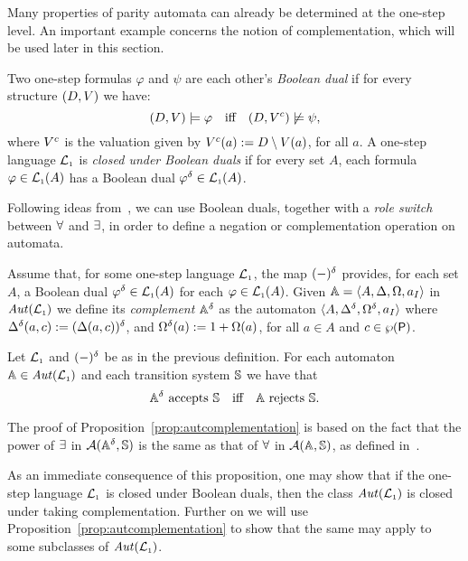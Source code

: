 Many properties of parity automata can already be determined at the one-step level.
An important example concerns the notion of complementation, which will be used later in this section.


\begin{definition}
\label{d:bdual1}
Two one-step formulas $\varphi$ and $\psi$ are each other's \emph{Boolean dual}
if for every structure $(D,V)$ we have:
\[
(D,\val) \models \varphi \quad\text{iff}\quad (D,\val^{c}) \not\models \psi,
\]
where $V^{c}$ is the valuation given by $V^{c}(a) \mathrel{:=} D
\setminus V(a)$, for all $a$.
%
A one-step language $\mathcal{L}_{\scriptscriptstyle 1}$ is \emph{closed under Boolean duals} if for every
set $A$, each formula $\varphi \in \mathcal{L}_{\scriptscriptstyle 1}(A)$ has a Boolean dual $\varphi^{\delta}
\in \mathcal{L}_{\scriptscriptstyle 1}(A)$.
\end{definition}

Following ideas from~\cite{Muller1987,DBLP:conf/calco/KissigV09}, we can use Boolean duals, together with a
\emph{role switch} between $\forall$ and $\exists$, in order to define a
negation or complementation operation on automata.

\begin{definition}
\label{d:caut}
Assume that, for some one-step language $\mathcal{L}_{\scriptscriptstyle 1}$, the map $(-)^{\delta}$
provides, for each set $A$, a Boolean dual $\varphi^{\delta} \in \mathcal{L}_{\scriptscriptstyle 1}(A)$ for each
$\varphi \in \mathcal{L}_{\scriptscriptstyle 1}(A)$.
Given $\mathbb{A} = \langle{A,\Delta,\Omega,a_I}\rangle$ in $\mathit{Aut}(\mathcal{L}_{\scriptscriptstyle 1})$ we define its
\emph{complement} $\mathbb{A}^{\delta}$ as the automaton
$\langle{A,\Delta^{\delta},\Omega^{\delta},a_I}\rangle$
where $\Delta^{\delta}(a,c) := (\Delta(a,c))^{\delta}$, and $\Omega^{\delta}(a)
:= 1 + \Omega(a)$, for all $a \in A$ and $c \in \wp(\mathsf{P})$.
\end{definition}

\begin{proposition}
\label{prop:autcomplementation}
Let $\mathcal{L}_{\scriptscriptstyle 1}$ and $(-)^{\delta}$ be as in the previous definition.
For each automaton $\mathbb{A} \in \mathit{Aut}(\mathcal{L}_{\scriptscriptstyle 1})$ and each transition system
$\mathbb{S}$ we have that
\[
\dual{\aut} \text{ accepts } \model
\quad\text{iff}\quad
\aut \text{ rejects } \model.
\]
\end{proposition}

The proof of Proposition~\ref{prop:autcomplementation} is based on the fact
that the power of $\exists$ in $\mathcal{A}(\mathbb{A}^{\delta},\mathbb{S})$ is the same
as that of $\forall$ in $\mathcal{A}(\mathbb{A},\mathbb{S})$, as defined in~\cite{DBLP:conf/calco/KissigV09}.

As an immediate consequence of this proposition, one may show that if the
one-step language $\mathcal{L}_{\scriptscriptstyle 1}$ is closed under Boolean duals, then the class
$\mathit{Aut}(\mathcal{L}_{\scriptscriptstyle 1})$ is closed under taking complementation.
Further on we will use Proposition~\ref{prop:autcomplementation} to show that
the same may apply to some subclasses of $\mathit{Aut}(\mathcal{L}_{\scriptscriptstyle 1})$.



